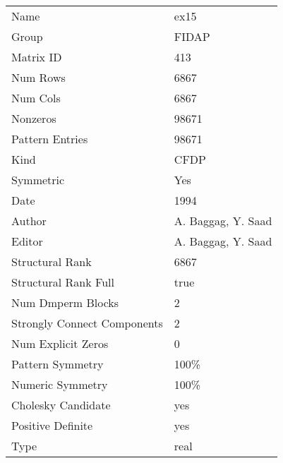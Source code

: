 \begin{tabular}{ll}
\midrule
                       Name &                                 ex15 \\
                      Group &                                FIDAP \\
                  Matrix ID &                                  413 \\
                   Num Rows &                                 6867 \\
                   Num Cols &                                 6867 \\
                   Nonzeros &                                98671 \\
            Pattern Entries &                                98671 \\
                       Kind & CFDP \\
                  Symmetric &                                  Yes \\
                       Date &                                 1994 \\
                     Author &                   A. Baggag, Y. Saad \\
                     Editor &                   A. Baggag, Y. Saad \\
            Structural Rank &                                 6867 \\
       Structural Rank Full &                                 true \\
          Num Dmperm Blocks &                                    2 \\
Strongly Connect Components &                                    2 \\
         Num Explicit Zeros &                                    0 \\
           Pattern Symmetry &                                 100\% \\
           Numeric Symmetry &                                 100\% \\
         Cholesky Candidate &                                  yes \\
          Positive Definite &                                  yes \\
                       Type &                                 real \\
\bottomrule
\end{tabular}
